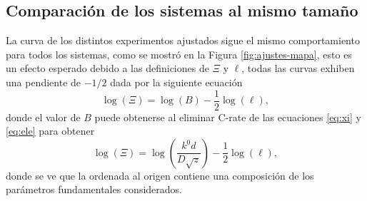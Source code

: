 \subsection{Comparación de los sistemas al mismo tamaño}

La curva de los distintos experimentos ajustados sigue el mismo comportamiento 
para todos los sistemas, como se mostró en la Figura \ref{fig:ajustes-mapa},
esto es un efecto esperado debido a las definiciones de $\Xi$ y $\ell$, todas las
curvas exhiben una pendiente de $-1/2$ dada por la siguiente ecuación
\begin{equation}
    \log(\Xi) = \log(B) - \frac{1}{2}\log(\ell),
\end{equation}
donde el valor de $B$ puede obtenerse al eliminar C-rate de las ecuaciones 
\ref{eq:xi} y \ref{eq:ele} para obtener
\begin{equation}
    \log(\Xi) = \log(\frac{k^0 d}{D \sqrt{z}}) - \frac{1}{2}\log(\ell),
\end{equation}
donde se ve que la ordenada al origen contiene una composición de los parámetros
fundamentales considerados. 

